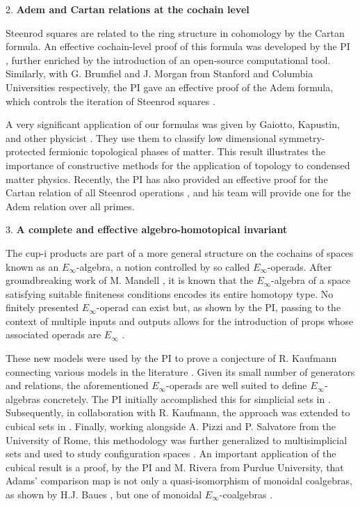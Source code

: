 \documentclass{amsart}
\begin{document}
	2. \textbf{Adem and Cartan relations at the cochain level}

	Steenrod squares are related to the ring structure in cohomology by the Cartan formula. An effective cochain-level proof of this formula was developed by the PI \cite{medina2020cartan}, further enriched by the introduction of an open-source computational tool. Similarly, with G. Brumfiel and J. Morgan from Stanford and Columbia Universities respectively, the PI gave an effective proof of the Adem formula, which controls the iteration of Steenrod squares \cite{medina2021adem}.

	A very significant application of our formulas was given by Gaiotto, Kapustin, and other physicist \cite{kapustin2017fermionic, barkeshli2022classification}.
	They use them to classify low dimensional symmetry-protected fermionic topological phases of matter. This result illustrates the importance of constructive methods for the application of topology to condensed matter physics.
	Recently, the PI has also provided an effective proof for the Cartan relation of all Steenrod operations \cite{medina2023oddcartan}, and his team will provide one for the Adem relation over all primes.

	3. \textbf{A complete and effective algebro-homotopical invariant}

	The cup-i products are part of a more general structure on the cochains of spaces known as an $E_\infty$-algebra, a notion controlled by so called $E_\infty$-operads. After groundbreaking work of M. Mandell \cite{mandell2006homotopy_type}, it is known that the $E_\infty$-algebra of a space satisfying suitable finiteness conditions encodes its entire homotopy type. No finitely presented $E_\infty$-operad can exist but, as shown by the PI, passing to the context of multiple inputs and outputs allows for the introduction of props whose associated operads are $E_\infty$ \cite{medina2020prop1,medina2021prop2}.

	These new models were used by the PI to prove a conjecture of R. Kaufmann connecting various models in the literature \cite{kaufmann2009dimension}. Given its small number of generators and relations, the aforementioned $E_\infty$-operads are well suited to define $E_\infty$-algebras concretely. The PI initially accomplished this for simplicial sets in \cite{medina2020prop1}. Subsequently, in collaboration with R. Kaufmann, the approach was extended to cubical sets in \cite{medina2022cube_einfty}. Finally, working alongside A. Pizzi and P. Salvatore from the University of Rome, this methodology was further generalized to multisimplicial sets and used to study configuration spaces \cite{medina2022multisimplicial}. An important application of the cubical result is a proof, by the PI and M. Rivera from Purdue University, that Adams' comparison map is not only a quasi-isomorphism of monoidal coalgebras, as shown by H.J. Baues \cite{baues1998hopf}, but one of monoidal $E_\infty$-coalgebras \cite{medina2021cobar}.
\end{document}

